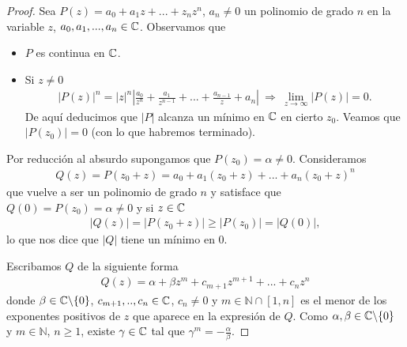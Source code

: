 \begin{proof}
    Sea $P(z) = a_0 + a_1z + ... + z_nz^n$, $a_n \not = 0$ un polinomio de grado $n$ en la variable $z$, $a_0, a_1,...,a_n \in \mathbb{C}$. Observamos que
    \begin{itemize}
        \item $P$ es continua en $\mathbb{C}$.
        \item Si $z \not = 0$
              \begin{align*}
                  |P(z)|^n = |z|^n \left| \frac{a_0}{z^n} + \frac{a_1}{z^{n-1}} + ... + \frac{a_{n-1}}{z} + a_n\right| \ \Longrightarrow \ \lim_{z \to \infty}{|P(z)| = 0}.
              \end{align*}
              De aquí deducimos que $|P|$ alcanza un mínimo en $\mathbb{C}$ en cierto $z_0$. Veamos que $|P(z_0)| = 0$ (con lo que habremos terminado).
    \end{itemize}
    Por reducción al absurdo supongamos que $P(z_0) = \alpha \not = 0$. Consideramos
    \begin{align*}
        Q(z) = P(z_0 + z) = a_0 + a_1(z_0 + z) + ... + a_n(z_0 + z)^n
    \end{align*}
    que vuelve a ser un polinomio de grado $n$ y satisface que $Q(0) = P(z_0) = \alpha \not = 0$ y si $z \in \mathbb{C}$
    \begin{align*}
        |Q(z)| = |P(z_0 + z)| \ge |P(z_0)| = |Q(0)|,
    \end{align*}
    lo que nos dice que $|Q|$ tiene un mínimo en 0.

    Escribamos $Q$ de la siguiente forma
    \begin{align*}
        Q(z) = \alpha + \beta z^m + c_{m+1}z^{m+1} + ... + c_n z^n
    \end{align*}
    donde $\beta \in \mathbb{C} \backslash \{0\}$, $c_{m+1},..,c_n \in \mathbb{C}$, $c_n \not = 0$ y $m \in \mathbb{N} \cap [1,n]$ es el menor de los exponentes positivos de $z$ que aparece en la expresión de $Q$. Como $\alpha, \beta \in \mathbb{C} \backslash \{0\}$ y $m \in \mathbb{N}$, $n \ge 1$, existe $\gamma \in \mathbb{C}$ tal que $\gamma^m = -\frac{\alpha}{\beta}$.


\end{proof}
